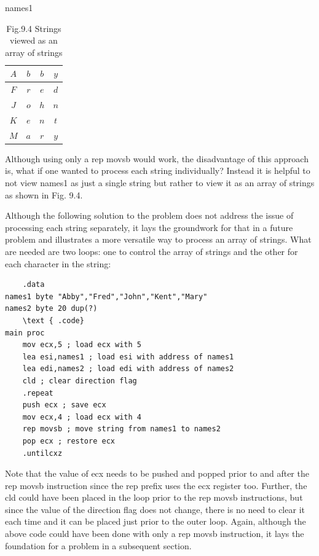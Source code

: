 \documentclass[10pt]{article}
\begin{document}
names1

\begin{table}[h]
\begin{center}
\captionsetup{labelformat=empty}
\caption{Fig.9.4 Strings viewed as an array of strings}
\begin{tabular}{|c|c|c|c|}
\hline
$A$ & $b$ & $b$ & $y$ \\
\hline
$F$ & $r$ & $e$ & $d$ \\
\hline
$J$ & $o$ & $h$ & $n$ \\
\hline
$K$ & $e$ & $n$ & $t$ \\
\hline
$M$ & $a$ & $r$ & $y$ \\
\hline
\end{tabular}
\end{center}
\end{table}

Although using only a rep movsb would work, the disadvantage of this approach is, what if one wanted to process each string individually? Instead it is helpful to not view names1 as just a single string but rather to view it as an array of strings as shown in Fig. 9.4.

Although the following solution to the problem does not address the issue of processing each string separately, it lays the groundwork for that in a future problem and illustrates a more versatile way to process an array of strings. What are needed are two loops: one to control the array of strings and the other for each character in the string:

\begin{verbatim}
    .data
names1 byte "Abby","Fred","John","Kent","Mary"
names2 byte 20 dup(?)
    \text { .code}
main proc
    mov ecx,5 ; load ecx with 5
    lea esi,names1 ; load esi with address of names1
    lea edi,names2 ; load edi with address of names2
    cld ; clear direction flag
    .repeat
    push ecx ; save ecx
    mov ecx,4 ; load ecx with 4
    rep movsb ; move string from names1 to names2
    pop ecx ; restore ecx
    .untilcxz
\end{verbatim}

Note that the value of ecx needs to be pushed and popped prior to and after the rep movsb instruction since the rep prefix uses the ecx register too. Further, the cld could have been placed in the loop prior to the rep movsb instructions, but since the value of the direction flag does not change, there is no need to clear it each time and it can be placed just prior to the outer loop. Again, although the above code could have been done with only a rep movsb instruction, it lays the foundation for a problem in a subsequent section.
\end{document}
